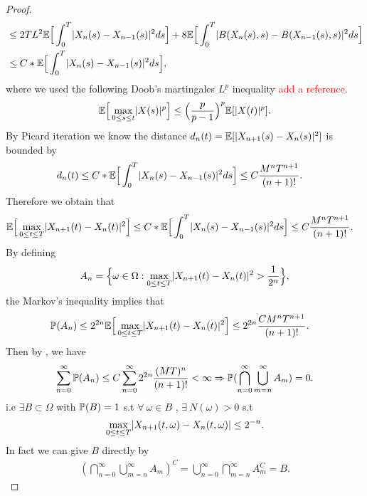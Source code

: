 \begin{proof}
\begin{align*}
    &\le  2TL^2 \E\Big[\int_0^{T} \abs{X_{n}(s) - X_{n-1}(s)  }^2 ds \Big] + 8\E\Big[\int_0^{T} \abs{B(X_{n}(s),s  )-B(X_{n-1}(s),s )}^2 ds \Big]\\
    &\le C*\E\Big[\int_0^{T} \abs{X_{n}(s)-X_{n-1}(s)  }^2 ds \Big]
 ,\end{align*}
where we used the following Doob's martingales $L^{p}$ inequality \textcolor{red}{add a reference}.
  \begin{align*}
    \E\Big[\max_{0\le s\le t} \abs{X(s)}^{p} \Big] \le   \Big(\frac{p}{p-1}\Big)^{p} \E[\abs{X(t)}^{p}  ] 
  .\end{align*}
  By Picard iteration we know the distance $d_{n}(t) = \E[\abs{X_{n+1}(s)-X_{n}(s)  }^2] $ is bounded by 
  \begin{align*}
   d_{n}(t) \leq C*\E\Big[\int_0^{T} \abs{X_{n}(s)-X_{n-1}(s)  }^2 ds \Big] 
                                                     &\le C \frac{M^{n} T^{n+1} }{(n+1)!}
  .\end{align*}
  Therefore we obtain that
\begin{align*}
&\E\Big[\max_{0\le t \le T} \abs{X_{n+1}(t) - X_{n}(t)  }^2\Big]\le C*\E\Big[\int_0^{T} \abs{X_{n}(s)-X_{n-1}(s)  }^2 ds \Big]\le C \frac{M^{n} T^{n+1} }{(n+1)!}
.\end{align*}  
By defining 
$$
A_n=\Big\{\omega\in\Omega:\max_{0\le t\le T} \abs{X_{n+1}(t)-X_n(t)}^2 > \frac{1}{2^{n} }\Big\},
$$
the Markov's inequality implies that
  \begin{align*}
    \P(A_n) &\le 2^{2n} \E\Big[\max_{0\le t\le T} \abs{X_{n+1}(t)-X_n(t)}^2\Big]\le 2^{2n} \frac{CM^{n}T^{n+1}  }{(n+1)!} 
  .\end{align*}
  Then by , we have
  \begin{align*}
    \sum_{n=0}^{\infty} \P(A_n) \le  C \sum_{n=0}^{\infty}2^{2n} \frac{(MT)^{n} }{(n+1)!}    <\infty \implies \P(\bigcap_{n=0}^{\infty} \bigcup_{m=n}^{\infty} A_m ) = 0
   .\end{align*}
   i.e $\exists  B \subset  \Omega  $ with $\P(B) = 1$ s.t $\forall \ \omega  \in  B$ , $\exists \ N(\omega ) > 0 $ s.t
   \begin{align*}
     \max_{0\le t\le T} \abs{X_{n+1}(t,\omega ) - X_{n}(t,\omega )} \le  2^{-n} 
   .\end{align*}
   In fact we can give $B$ directly by 
   \begin{align*}
     \left( \bigcap_{n=0}^{\infty} \bigcup_{m=n}^{\infty} A_m   \right)^{C} = \bigcup_{n=0}^{\infty} \bigcap_{m=n}^{\infty} A_m^{C} = B     
   .\end{align*}

\end{proof}
